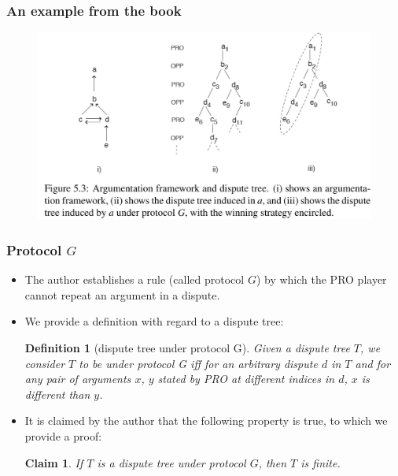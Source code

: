 \documentclass{beamer}
\newtheorem{Def}{Definition}[subsection]
\newtheorem{Claim}{Claim}
\begin{document}
\begin{frame}
	\frametitle{An example from the book}
	\begin{figure}
		\includegraphics[width=\textwidth]{images/dispute_tree}
	\end{figure}
\end{frame}

\begin{frame}
	\frametitle{Protocol $G$}
	\begin{itemize}
		\item The author establishes a rule (called protocol $G$) by which the PRO player cannot repeat an argument in a dispute.\pause
		\item We provide a definition with regard to a dispute tree:\pause
		\begin{Def}[dispute tree under protocol G]\label{protG}
			Given a dispute tree $T$, we consider $T$ to be under protocol G iff for an arbitrary dispute $d$ in $T$ and for any pair of arguments $x$, $y$ stated by PRO at different indices in $d$, $x$ is different than $y$.
		\end{Def}\pause
		\item It is claimed by the author that the following property is true, to which we provide a proof:\pause

		\begin{Claim}
			If $T$ is a dispute tree under protocol $G$, then $T$ is finite.
		\end{Claim}
	\end{itemize}
\end{frame}
\end{document}
